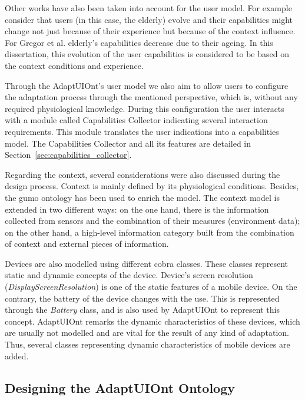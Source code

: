 Other works have also been taken into account for the user model. For example
~\citet{gregor_designing_2002} consider that users (in this case, the elderly)
evolve and their capabilities might change not just because of their experience
but because of the context influence. For Gregor et al. elderly's capabilities
decrease due to their ageing. In this dissertation, this evolution of the user
capabilities is considered to be based on the context conditions and experience.

Through the AdaptUIOnt's user model we also aim to allow users to configure the 
adaptation process through the mentioned perspective, which is, without any required
physiological knowledge. During this configuration the user interacts with a
module called Capabilities Collector indicating several interaction requirements.
This module translates the user indications into a capabilities model. The
Capabilities Collector and all its features are detailed in
Section~\ref{sec:capabilities_collector}.

Regarding the context, several considerations were also discussed during the 
design process. Context is mainly defined by its physiological conditions. 
Besides, the \ac{gumo} ontology has been used 
to enrich the model. The context model is extended in two different ways: on the 
one hand, there is the information collected from sensors and the combination of 
their measures (environment data); on the other hand, a high-level information 
category built from the combination of context and external pieces of information.

Devices are also modelled using different \ac{cobra} classes. These
classes represent static and dynamic concepts of the device. Device's screen
resolution (\textit{DisplayScreenResolution}) is one of the static features of a
mobile device. On the contrary, the battery of the device changes with the use.
This is represented through the \textit{Battery} class, and is also used by
AdaptUIOnt to represent this concept. AdaptUIOnt remarks the dynamic characteristics
of these devices, which are usually not modelled and are vital for the result of
any kind of adaptation. Thus, several classes representing dynamic characteristics
of mobile devices are added.



\subsection{Designing the AdaptUIOnt Ontology}
\label{sec:model_detail}

